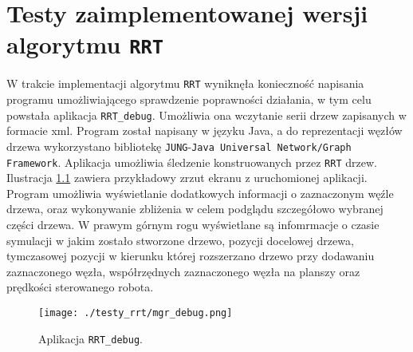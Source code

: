 \chapter[Testy zaimplementowanej wersji algorytmu \texttt{RRT} ]{Testy zaimplementowanej wersji algorytmu \texttt{RRT} \label{chap:rrttest}}
W trakcie implementacji algorytmu \texttt{RRT} wyniknęła konieczność napisania programu umożliwiającego sprawdzenie poprawności działania, w tym celu powstała aplikacja
\texttt{RRT\_debug}. Umożliwia ona wczytanie serii drzew zapisanych w formacie xml. Program został napisany w języku Java, a do reprezentacji węzłów drzewa wykorzystano bibliotekę
\texttt{JUNG}-\texttt{Java Universal Network/Graph Framework}. Aplikacja umożliwia śledzenie konstruowanych przez \texttt{RRT} drzew. Ilustracja \ref{fig:mgr_debug} zawiera 
przykładowy zrzut ekranu z uruchomionej aplikacji.  Program umożliwia wyświetlanie dodatkowych informacji o zaznaczonym węźle drzewa, oraz wykonywanie zbliżenia w celem
podglądu szczegółowo wybranej części drzewa. W prawym górnym rogu wyświetlane są infomrmacje o czasie symulacji w jakim zostało stworzone drzewo, pozycji docelowej drzewa,
tymczasowej pozycji w kierunku której rozszerzano drzewo przy dodawaniu zaznaczonego węzła, współrzędnych zaznaczonego węzła na planszy oraz prędkości sterowanego robota.
\begin{figure}[H]
\centering
\texttt{[image: ./testy\_rrt/mgr\_debug.png]}
\caption{Aplikacja \texttt{RRT\_debug}.} \label{fig:mgr_debug}
\end{figure} 

